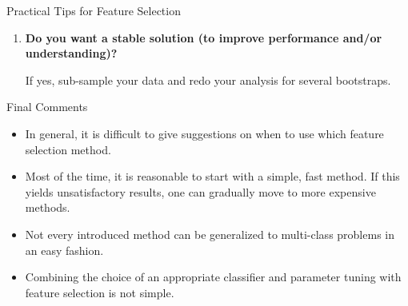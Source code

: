 \documentclass[11pt,compress,t,notes=noshow, xcolor=table]{beamer}
\begin{document}
\begin{vbframe}{Practical Tips for Feature Selection}
\begin{enumerate}
      If yes, compare several feature selection methods, including your new idea, correlation coefficients, backward selection and embedded methods.
      Use linear and nonlinear predictors.
      Select the best approach via model selection.
      \item {\bf Do you want a stable solution (to improve performance and/or understanding)?}

      If yes, sub-sample your data and redo your analysis for several bootstraps.
    \end{enumerate}

  \end{vbframe}

  \begin{vbframe}{Final Comments}

    \begin{itemize}
      \item In general, it is difficult to give suggestions on when to use which feature selection method.
      \item Most of the time, it is reasonable to start with a simple, fast method.
      If this yields unsatisfactory results, one can gradually move to more expensive methods.
      \item Not every introduced method can be generalized to multi-class problems in an easy fashion.
      \item Combining the choice of an appropriate classifier and parameter tuning with feature selection is not simple.
    \end{itemize}

  \end{vbframe}


  \endlecture
\end{document}
